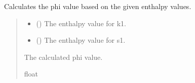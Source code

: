 \documentclass[a4paper,11pt,english,openany]{sphinxmanual}
\begin{document}
\begin{fulllineitems}
\label{\detokenize{api/spyice.update_physical_values:src.spyice.update_physical_values.phi_func}}
\pysigstartsignatures
\pysiglinewithargsret
{}
{\sphinxparamcomma {}}
{}
\pysigstopsignatures
\sphinxAtStartPar
Calculates the phi value based on the given enthalpy values.
\begin{quote}\begin{description}
\begin{itemize}
\item {} 
\sphinxAtStartPar
{} () \textendash{} The enthalpy value for k1.

\item {} 
\sphinxAtStartPar
{} () \textendash{} The enthalpy value for s1.

\end{itemize}

\sphinxAtStartPar
The calculated phi value.

\sphinxAtStartPar
float

\end{description}\end{quote}

\end{fulllineitems}

\end{document}
